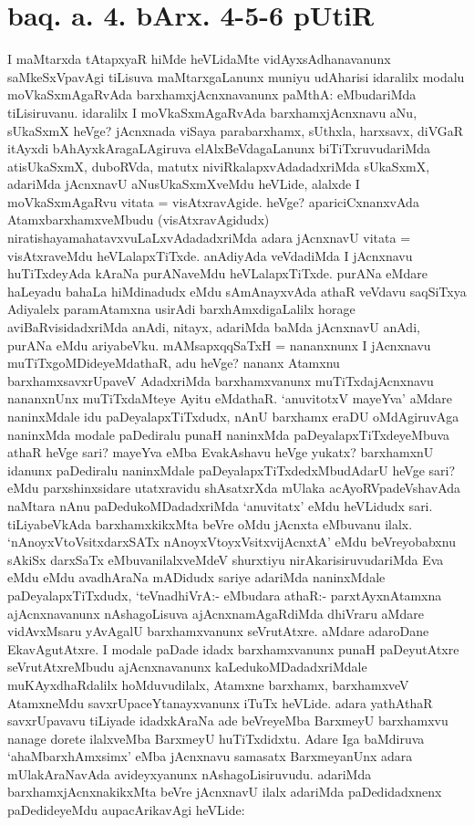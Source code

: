 
\section*{baq. a. 4. bArx. 4-5-6 pUtiR}


\begin{artha}
I maMtarxda tAtapxyaR hiMde heVLidaMte vidAyxsAdhanavanunx saMkeSxVpavAgi tiLisuva maMtarxgaLanunx muniyu udAharisi idaralilx modalu moVkaSxmAgaRvAda barxhamxjAcnxnavanunx paMthA: eMbudariMda tiLisiruvanu. idaralilx I moVkaSxmAgaRvAda barxhamxjAcnxnavu aNu, sUkaSxmX heVge? jAcnxnada viSaya parabarxhamx, sUthxla, harxsavx, diVGaR itAyxdi bAhAyxkAragaLAgiruva elAlxBeVdagaLanunx biTiTxruvudariMda atisUkaSxmX, duboRVda, matutx niviRkalapxvAdadadxriMda sUkaSxmX, adariMda jAcnxnavU aNusUkaSxmXveMdu heVLide, alalxde I moVkaSxmAgaRvu vitata = visAtxravAgide. heVge? apariciCxnanxvAda AtamxbarxhamxveMbudu (visAtxravAgidudx) niratishayamahatavxvuLaLxvAdadadxriMda adara jAcnxnavU vitata = visAtxraveMdu heVLalapxTiTxde. anAdiyAda veVdadiMda I jAcnxnavu huTiTxdeyAda kAraNa purANaveMdu heVLalapxTiTxde. purANa eMdare haLeyadu bahaLa hiMdinadudx eMdu sAmAnayxvAda athaR veVdavu saqSiTxya Adiyalelx paramAtamxna usirAdi barxhAmxdigaLalilx horage aviBaRvisidadxriMda anAdi, nitayx, adariMda baMda jAcnxnavU anAdi, purANa eMdu ariyabeVku. mAMsapxqqSaTxH = nananxnunx I jAcnxnavu muTiTxgoMDideyeMdathaR, adu heVge? nananx Atamxnu barxhamxsavxrUpaveV AdadxriMda barxhamxvanunx muTiTxdajAcnxnavu nananxnUnx muTiTxdaMteye Ayitu eMdathaR. `anuvitotxV mayeYva' aMdare naninxMdale idu paDeyalapxTiTxdudx, nAnU barxhamx eraDU oMdAgiruvAga naninxMda modale paDediralu punaH naninxMda paDeyalapxTiTxdeyeMbuva athaR heVge sari? mayeYva eMba EvakAshavu heVge yukatx? barxhamxnU idanunx paDediralu naninxMdale paDeyalapxTiTxdedxMbudAdarU heVge sari? eMdu parxshinxsidare utatxravidu shAsatxrXda mUlaka acAyoRVpadeVshavAda naMtara nAnu paDedukoMDadadxriMda `anuvitatx' eMdu heVLidudx sari. tiLiyabeVkAda barxhamxkikxMta beVre oMdu jAcnxta eMbuvanu ilalx. `nAnoyxV\s toV\s sitxdarxSATx nAnoyxVtoyxVsitxvijAcnxtA' eMdu beVreyobabxnu sAkiSx darxSaTx eMbuvanilalxveMdeV shurxtiyu nirAkarisiruvudariMda Eva eMdu eMdu avadhAraNa mADidudx sariye adariMda naninxMdale paDeyalapxTiTxdudx, `teVnadhiVrA:- eMbudara athaR:- parxtAyxnAtamxna ajAcnxnavanunx nAshagoLisuva ajAcnxnamAgaRdiMda dhiVraru aMdare vidAvxMsaru yAvAgalU barxhamxvanunx seVrutAtxre. aMdare adaroDane EkavAgutAtxre. I modale paDade idadx barxhamxvanunx punaH paDeyutAtxre seVrutAtxreMbudu ajAcnxnavanunx kaLedukoMDadadxriMdale muKAyxdhaRdalilx hoMduvudilalx, Atamxne barxhamx, barxhamxveV AtamxneMdu savxrUpaceYtanayxvanunx iTuTx heVLide. adara yathAthaR savxrUpavavu tiLiyade idadxkAraNa ade beVreyeMba BarxmeyU barxhamxvu nanage dorete ilalxveMba BarxmeyU huTiTxdidxtu. Adare Iga baMdiruva `ahaMbarxhAmxsimx' eMba jAcnxnavu samasatx BarxmeyanUnx adara mUlakAraNavAda avideyxyanunx nAshagoLisiruvudu. adariMda barxhamxjAcnxnakikxMta beVre jAcnxnavU ilalx adariMda paDedidadxnenx paDedideyeMdu aupacArikavAgi heVLide:
\end{artha}

